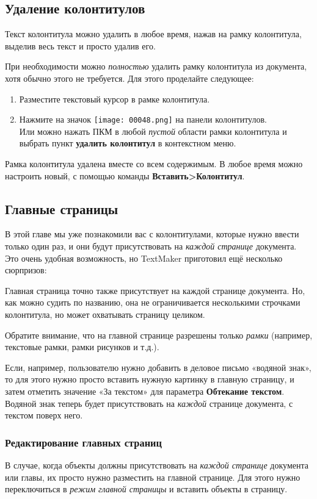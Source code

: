 \documentclass[a4paper,10pt]{article}
\begin{document}
\subsection{Удаление колонтитулов}
Текст колонтитула можно удалить в любое время, нажав на рамку колонтитула, выделив весь текст и просто удалив его.

При необходимости можно \textit{полностью} удалить рамку колонтитула из документа, хотя обычно этого не требуется. Для этого проделайте следующее:
\begin{enumerate}
 \item Разместите текстовый курсор в рамке колонтитула.
 \item Нажмите на значок \texttt{[image: 00048.png]} на панели колонтитулов.\\
 Или можно нажать ПКМ в любой \textit{пустой} области рамки колонтитула и выбрать пункт \textbf{удалить колонтитул} в контекстном меню.
\end{enumerate}

Рамка колонтитула удалена вместе со всем содержимым. В любое время можно настроить новый, с помощью команды \textbf{Вставить>Колонтитул}.

\subsection{Главные страницы}
В этой главе мы уже познакомили вас с колонтитулами, которые нужно ввести только один раз, и они будут присутствовать на \textit{каждой странице} документа. Это очень удобная возможность, но TextMaker приготовил ещё несколько сюрпризов:

Главная страница точно также присутствует на каждой странице документа. Но, как можно судить по названию, она не ограничивается несколькими строчками колонтитула, но может охватывать страницу целиком.

Обратите внимание, что на главной странице разрешены только \textit{рамки} (например, текстовые рамки, рамки рисунков и т.д.).

Если, например, пользователю нужно добавить в деловое письмо «водяной знак», то для этого нужно просто вставить нужную картинку в главную страницу, и затем отметить значение «За текстом» для параметра \textbf{Обтекание текстом}. Водяной знак теперь будет присутствовать на \textit{каждой} странице документа, с текстом поверх него.

\subsubsection{Редактирование главных страниц}
В случае, когда объекты должны присутствовать на \textit{каждой странице} документа или главы, их просто нужно разместить на главной странице. Для этого нужно переключиться в \textit{режим главной страницы} и вставить объекты в страницу.
\end{document}
